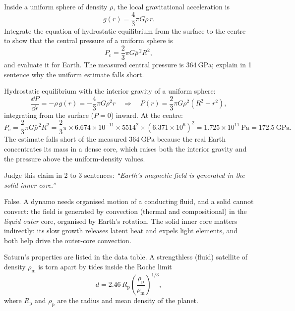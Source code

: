 \parti {} Inside a uniform sphere of density $\rho$, the local gravitational acceleration is
\[
  g(r) = \frac{4}{3} \pi G \rho\, r.
\]
Integrate the equation of hydrostatic equilibrium from the surface to the centre to show that the central pressure of a uniform sphere is
\[
  P_{\mathrm{c}} = \frac{2}{3} \pi G \bar{\rho}^{\,2} R^2,
\]
and evaluate it for Earth.
The measured central pressure is $364\ \mathrm{GPa}$; explain in 1 sentence why the uniform estimate falls short.

\begin{solution}
Hydrostatic equilibrium with the interior gravity of a uniform sphere:
\[
  \frac{\dd P}{\dd r} = -\rho\, g(r) = -\frac{4}{3} \pi G \rho^2 r
  \quad \Longrightarrow \quad
  P(r) = \frac{2}{3} \pi G \rho^2 \left( R^2 - r^2 \right),
\]
integrating from the surface ($P = 0$) inward. At the centre:
\[
  P_{\mathrm{c}} = \frac{2}{3} \pi G \bar{\rho}^{\,2} R^2
    = \frac{2}{3} \pi \times 6.674 \times 10^{-11} \times 5514^2 \times (6.371 \times 10^{6})^2
    = 1.725 \times 10^{11}\ \mathrm{Pa} = 172.5\ \mathrm{GPa}.
\]
The estimate falls short of the measured $364\ \mathrm{GPa}$ because the real Earth concentrates its mass in a dense core, which raises both the interior gravity and the pressure above the uniform-density values.
\end{solution}

\parti {} Judge this claim in 2 to 3 sentences:
\emph{``Earth's magnetic field is generated in the solid inner core.''}

\begin{solution}
False.
A dynamo needs organised motion of a conducting fluid, and a solid cannot convect: the field is generated by convection (thermal and compositional) in the \emph{liquid outer} core, organised by Earth's rotation.
The solid inner core matters indirectly: its slow growth releases latent heat and expels light elements, and both help drive the outer-core convection.
\end{solution}



Saturn's properties are listed in the data table.
A strengthless (fluid) satellite of density $\rho_{\mathrm{m}}$ is torn apart by tides inside the Roche limit
\[
  d = 2.46\, R_{\mathrm{p}} \left( \frac{\rho_{\mathrm{p}}}{\rho_{\mathrm{m}}} \right)^{1/3},
\]
where $R_{\mathrm{p}}$ and $\rho_{\mathrm{p}}$ are the radius and mean density of the planet.

